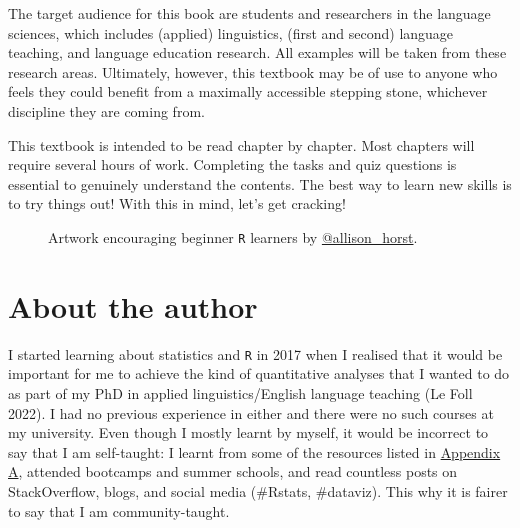 \documentclass[
  letterpaper,
  DIV=11,
  numbers=noendperiod]{scrreprt}
\begin{document}

The target audience for this book are students and researchers in the
language sciences, which includes (applied) linguistics, (first and
second) language teaching, and language education research. All examples
will be taken from these research areas. Ultimately, however, this
textbook may be of use to anyone who feels they could benefit from a
maximally accessible stepping stone, whichever discipline they are
coming from.

This textbook is intended to be read chapter by chapter. Most chapters
will require several hours of work. Completing the tasks and quiz
questions is essential to genuinely understand the contents. The best
way to learn new skills is to try things out! With this in mind, let's
get cracking!

\begin{figure}


\caption{\label{fig-WeBelieveinYou}Artwork encouraging beginner
\texttt{R} learners by
\href{https://allisonhorst.com/allison-horst}{@allison\_horst}.}

\end{figure}%

\section*{About the author}\label{about-the-author}


I started learning about statistics and \texttt{R} in 2017 when I
realised that it would be important for me to achieve the kind of
quantitative analyses that I wanted to do as part of my PhD in applied
linguistics/English language teaching (Le Foll 2022). I had no previous
experience in either and there were no such courses at my university.
Even though I mostly learnt by myself, it would be incorrect to say that
I am self-taught: I learnt from some of the resources listed in
\hyperref[sec-AppendixA]{Appendix A}, attended bootcamps and summer
schools, and read countless posts on StackOverflow, blogs, and social
media (\#Rstats, \#dataviz). This why it is fairer to say that I am
community-taught.
\end{document}
